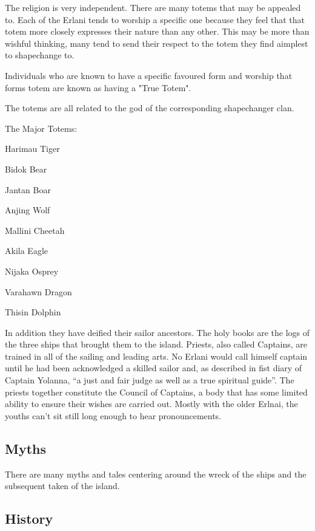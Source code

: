 The religion is very independent. There are many totems that may be
appealed to. Each of the Erlani tends to worship a specific one
because they feel that that totem more closely expresses their nature
than any other. This may be more than wishful thinking, many tend to
send their respect to the totem they find aimplest to shapechange to.

Individuals who are known to have a specific favoured form and
worship that forms totem are known as having a "True Totem".

The totems are all related to the god of the corresponding
shapechanger clan.

The Major Totems:

\begin{relate}
        \item[Harimau] Tiger
        \item[Bidok] Bear
        \item[Jantan] Boar
        \item[Anjing] Wolf
        \item[Mallini] Cheetah
        \item[Akila] Eagle
        \item[Nijaka] Osprey
        \item[Varahawn] Dragon
        \item[Thisin] Dolphin
\end{relate}

In addition they have deified their sailor ancestors. The holy books
are the logs of the three ships that brought them to the island.
Priests, also called Captains, are trained in all of the sailing
and leading arts. No Erlani would call himself captain until he had
been acknowledged a skilled sailor and, as described in fist diary of
Captain Yolanna, ``a just and fair judge as well as a true spiritual guide''.
The priests together constitute the Council of Captains, a body that 
has some limited ability to ensure their wishes are carried out. Mostly
with the older Erlnai, the youths can't sit still long enough to 
hear pronouncements.

\subsection{Myths}

There are many myths and tales centering around the wreck of the 
ships and the subsequent taken of the island. 

\subsection{History}

